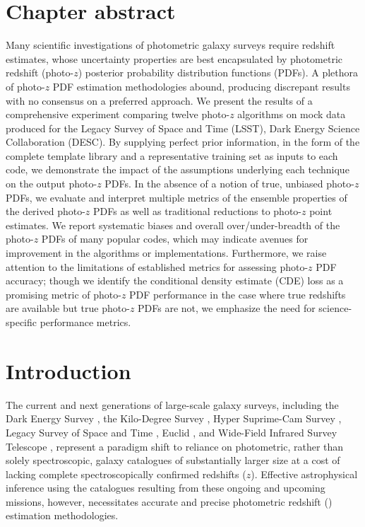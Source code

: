 
\section*{Chapter abstract}

Many scientific investigations of photometric galaxy surveys require redshift estimates, whose uncertainty properties are best encapsulated by photometric redshift (photo-$z$) posterior probability distribution functions (PDFs).
A plethora of photo-$z$ PDF estimation methodologies abound, producing discrepant results with no consensus on a preferred approach.
We present the results of a comprehensive experiment comparing twelve photo-$z$ algorithms on mock data produced for the Legacy Survey of Space and Time (\textsc{LSST}), Dark Energy Science Collaboration (\textsc{DESC}).
By supplying perfect prior information, in the form of the complete template library and a representative training set as inputs to each code, we demonstrate the impact of the assumptions underlying each technique on the output photo-$z$ PDFs.
In the absence of a notion of true, unbiased photo-$z$ PDFs, we evaluate and interpret multiple metrics of the ensemble properties of the derived photo-$z$ PDFs as well as traditional reductions to photo-$z$ point estimates.
We report systematic biases and overall over/under-breadth of the photo-$z$ PDFs of many popular codes, which may indicate avenues for improvement in the algorithms or implementations.
Furthermore, we raise attention to the limitations of established metrics for assessing photo-$z$ PDF accuracy; though we identify the conditional density estimate (CDE) loss as a promising metric of photo-$z$ PDF performance in the case where true redshifts are available but true photo-$z$ PDFs are not, we emphasize the need for science-specific performance metrics.

\section{Introduction}

The current and next generations of large-scale galaxy surveys, including the Dark Energy Survey \citep[\des,][]{the_dark_energy_survey_collaboration_dark_2005}, the Kilo-Degree Survey \citep[\kids,][]{de_jong_kilo-degree_2013}, Hyper Suprime-Cam Survey \citep[\hsc,][]{aihara_hyper_2018,aihara_first_2018}, Legacy Survey of Space and Time \citep[\lsst,][]{lsst_science_collaboration_lsst_2009}, Euclid \citep{laureijs_euclid_2011}, and Wide-Field Infrared Survey Telescope \citep[\wfirst,][]{green_wide-field_2012}, represent a paradigm shift to reliance on photometric, rather than solely spectroscopic, galaxy catalogues of substantially larger size at a cost of lacking complete spectroscopically confirmed redshifts ($z$).
Effective astrophysical inference using the catalogues resulting from these ongoing and upcoming missions, however, necessitates accurate and precise photometric redshift (\pz) estimation methodologies.

